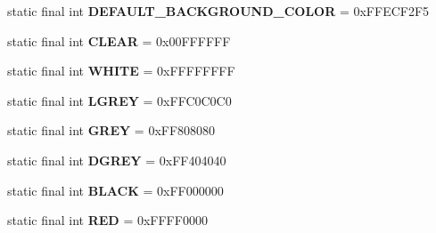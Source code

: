 \begin{DoxyCompactItemize}
\item 
\hypertarget{interfacehype_1_1core_1_1util_1_1_h_constants_a4736f0e0f4f1737d893d7e7f79f99a43}{static final int {\bfseries D\-E\-F\-A\-U\-L\-T\-\_\-\-B\-A\-C\-K\-G\-R\-O\-U\-N\-D\-\_\-\-C\-O\-L\-O\-R} = 0x\-F\-F\-E\-C\-F2\-F5}\label{interfacehype_1_1core_1_1util_1_1_h_constants_a4736f0e0f4f1737d893d7e7f79f99a43}

\item 
\hypertarget{interfacehype_1_1core_1_1util_1_1_h_constants_aae42c4a02c3b7107950431f546130dfd}{static final int {\bfseries C\-L\-E\-A\-R} = 0x00\-F\-F\-F\-F\-F\-F}\label{interfacehype_1_1core_1_1util_1_1_h_constants_aae42c4a02c3b7107950431f546130dfd}

\item 
\hypertarget{interfacehype_1_1core_1_1util_1_1_h_constants_ae2c416a1a0839435d8bb78a99ffcc6a2}{static final int {\bfseries W\-H\-I\-T\-E} = 0x\-F\-F\-F\-F\-F\-F\-F\-F}\label{interfacehype_1_1core_1_1util_1_1_h_constants_ae2c416a1a0839435d8bb78a99ffcc6a2}

\item 
\hypertarget{interfacehype_1_1core_1_1util_1_1_h_constants_ac6fd740a518ee3b13b9a5fd935e4ec3b}{static final int {\bfseries L\-G\-R\-E\-Y} = 0x\-F\-F\-C0\-C0\-C0}\label{interfacehype_1_1core_1_1util_1_1_h_constants_ac6fd740a518ee3b13b9a5fd935e4ec3b}

\item 
\hypertarget{interfacehype_1_1core_1_1util_1_1_h_constants_a8a8c051114547465274ac2df42297b50}{static final int {\bfseries G\-R\-E\-Y} = 0x\-F\-F808080}\label{interfacehype_1_1core_1_1util_1_1_h_constants_a8a8c051114547465274ac2df42297b50}

\item 
\hypertarget{interfacehype_1_1core_1_1util_1_1_h_constants_ad616476d5f8d57df6b0084b958af0ee0}{static final int {\bfseries D\-G\-R\-E\-Y} = 0x\-F\-F404040}\label{interfacehype_1_1core_1_1util_1_1_h_constants_ad616476d5f8d57df6b0084b958af0ee0}

\item 
\hypertarget{interfacehype_1_1core_1_1util_1_1_h_constants_a18f9c6b7f691224a5ee0c1ed0babf84a}{static final int {\bfseries B\-L\-A\-C\-K} = 0x\-F\-F000000}\label{interfacehype_1_1core_1_1util_1_1_h_constants_a18f9c6b7f691224a5ee0c1ed0babf84a}

\item 
\hypertarget{interfacehype_1_1core_1_1util_1_1_h_constants_a0ae8518a27a711fcea519f2796b29e90}{static final int {\bfseries R\-E\-D} = 0x\-F\-F\-F\-F0000}\label{interfacehype_1_1core_1_1util_1_1_h_constants_a0ae8518a27a711fcea519f2796b29e90}


\end{DoxyCompactItemize}
